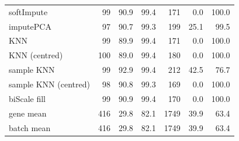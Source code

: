 \begin{tabular}{@{}lrrrrrr@{}}
softImpute & 99 & 90.9 & 99.4 & 171 & 0.0 & 100.0 \\
imputePCA & 97 & 90.7 & 99.3 & 199 & 25.1 & 99.5 \\
KNN & 99 & 89.9 & 99.4 & 171 & 0.0 & 100.0 \\
KNN (centred) & 100 & 89.0 & 99.4 & 180 & 0.0 & 100.0 \\
sample KNN & 99 & 92.9 & 99.4 & 212 & 42.5 & 76.7 \\
sample KNN (centred) & 98 & 90.8 & 99.3 & 169 & 0.0 & 100.0 \\
biScale fill & 99 & 90.9 & 99.4 & 170 & 0.0 & 100.0 \\
gene mean & 416 & 29.8 & 82.1 & 1749 & 39.9 & 63.4 \\
batch mean & 416 & 29.8 & 82.1 & 1749 & 39.9 & 63.4 \\
\bottomrule
\end{tabular}
